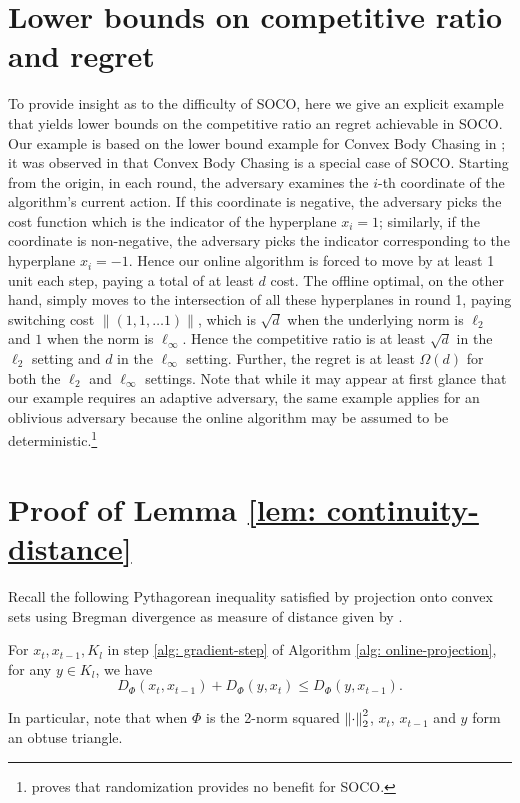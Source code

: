 
\section{Lower bounds on competitive ratio and regret}

 To provide insight as to the difficulty of SOCO, here we give an explicit example that yields lower bounds on the competitive ratio an regret achievable in SOCO. Our example is based on the lower bound example for Convex Body Chasing in \cite{Friedman1993}; it was observed in \cite{antoniadis2016} that Convex Body Chasing is a special case of SOCO. Starting from the origin, in each round, the adversary examines the $i$-th coordinate of the algorithm's current action. If this coordinate is negative, the adversary picks the cost function which is the indicator of the hyperplane $x_i = 1$; similarly, if the coordinate is non-negative, the adversary picks the indicator corresponding to the hyperplane $x_i = -1$. Hence our online algorithm is forced to move by at least 1 unit each step, paying a total of at least $d$ cost. The offline optimal, on the other hand, simply moves to the intersection of all these hyperplanes in round 1, paying switching cost $\| (1, 1, \ldots 1) \|$, which is $\sqrt{d}$ when the underlying norm is $\ell_2$ and $1$ when the norm is $\ell_{\infty}$. Hence the competitive ratio is at least $\sqrt{d}$ in the $\ell_2$ setting and $d$ in the $\ell_{\infty}$ setting. Further, the regret is at least $\Omega(d)$ for both the $\ell_2$ and $\ell_{\infty}$ settings. 
Note that while it may appear at first glance that our example requires an adaptive adversary, the same example applies for an oblivious adversary because the online algorithm may be assumed to be deterministic.\footnote{\cite{bansal2015} proves that randomization provides no benefit for SOCO.}


\section{Proof of Lemma \ref{lem: continuity-distance}}
\label{sec: proofs}
Recall the following Pythagorean inequality satisfied by projection onto convex sets using Bregman divergence as measure of distance given by \citet[Lemma 4.1]{bubeck2015}.
\begin{proposition} 
\label{prop: convex-proj-ineq}
For $x_t, x_{t-1}, K_l$ in step \ref{alg: gradient-step} of Algorithm \ref{alg: online-projection}, for any $y \in K_l$, we have 
\[D_{\Phi} (x_t , x_{t-1} ) + D_\Phi ( y, x_t )\le D_\Phi(y, x_{t-1}).\]
\end{proposition} 
%
In particular, note that when $\Phi$ is the 2-norm squared $\left\lVert \cdot \right\rVert_2^2$, $x_t$, $x_{t-1}$ and $y$ form an obtuse triangle. 

